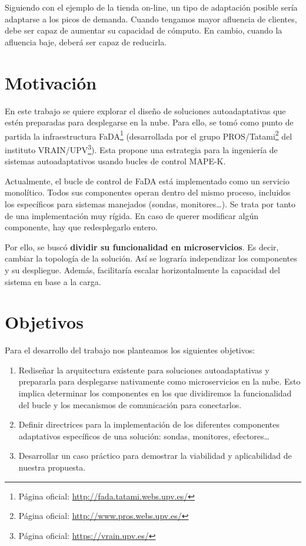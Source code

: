 Siguiendo con el ejemplo de la tienda on-line, un tipo de adaptación posible sería adaptarse a los picos de demanda. Cuando tengamos mayor afluencia de clientes, debe ser capaz de aumentar su capacidad de cómputo. En cambio, cuando la afluencia baje, deberá ser capaz de reducirla.

\section{Motivación}

En este trabajo se quiere explorar el diseño de soluciones autoadaptativas que estén preparadas para desplegarse en la nube. Para ello, se tomó como punto de partida la infraestructura FaDA\footnote{Página oficial: \url{http://fada.tatami.webs.upv.es/}} (desarrollada por el grupo PROS/Tatami\footnote{Página oficial: \url{http://www.pros.webs.upv.es/}} del instituto VRAIN/UPV\footnote{Página oficial: \url{https://vrain.upv.es/}}). Esta propone una estrategia para la ingeniería de sistemas autoadaptativos usando bucles de control MAPE-K\cite{ibmcorporationArchitecturalBlueprintAutonomic2006, fonsServiciosAdaptivereadyPara2021}.

Actualmente, el bucle de control de FaDA está implementado como un servicio monolítico. Todos sus componentes operan dentro del mismo proceso, incluidos los específicos para sistemas manejados (sondas, monitores\dots). Se trata por tanto de una implementación muy rígida. En caso de querer modificar algún componente, hay que redesplegarlo entero.

Por ello, se buscó \textbf{dividir su funcionalidad en microservicios}. Es decir, cambiar la topología de la solución. Así se lograría independizar los componentes y su despliegue. Además, facilitaría escalar horizontalmente la capacidad del sistema en base a la carga.

\section{Objetivos}

Para el desarrollo del trabajo nos planteamos los siguientes objetivos:

\begin{enumerate}
  \item Rediseñar la arquitectura existente para soluciones autoadaptativas y prepararla para desplegarse nativamente como microservicios en la nube. Esto implica determinar los componentes en los que dividiremos la funcionalidad del bucle y los mecanismos de comunicación para conectarlos.

  \item Definir directrices para la implementación de los diferentes componentes adaptativos específicos de una solución: sondas, monitores, efectores\dots

  \item Desarrollar un caso práctico para demostrar la viabilidad y aplicabilidad de nuestra propuesta.
\end{enumerate}

